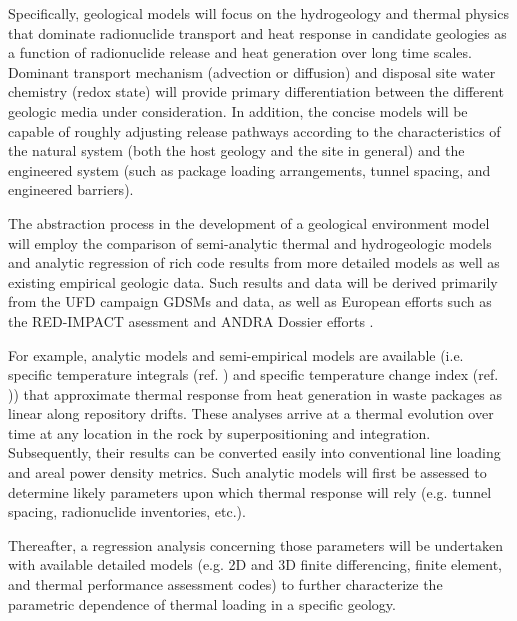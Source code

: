 Specifically, geological models will focus on the hydrogeology and thermal 
physics that dominate radionuclide transport and heat response in candidate 
geologies as a function of radionuclide release and heat generation over long 
time scales. Dominant transport mechanism (advection or 
diffusion) and disposal site water chemistry (redox state) will provide primary 
differentiation between the different geologic media under consideration. In 
addition, the concise models will be capable of roughly adjusting release 
pathways according to the characteristics of the natural system (both the host 
geology and the site in general) and the engineered system (such as package 
loading arrangements, tunnel spacing, and engineered barriers).


The abstraction process in the development of a geological environment model 
will employ the comparison of semi-analytic thermal and hydrogeologic models and 
analytic regression of rich code results from more detailed models as well as 
existing empirical geologic data. Such results and data will be derived 
primarily from the \gls{UFD} campaign \glspl{GDSM} and data, as well as European 
efforts such as the RED-IMPACT asessment and \gls{ANDRA} Dossier efforts 
\cite{von_lensa_red-impact_2008, andra_argile:_2005, clayton_generic_2011} . 


For example, analytic models and semi-empirical models are available (i.e.  
specific temperature integrals (ref. \cite{li_methodology_2006}) and specific 
temperature change index (ref. \cite{radel_effect_2007})) that approximate 
thermal response from heat generation in waste packages as linear along 
repository drifts. These analyses arrive at a thermal evolution over time at any 
location in the rock by superpositioning and integration. Subsequently, their 
results can be converted easily into conventional line loading and areal power 
density metrics.  Such analytic models will first be assessed to determine 
likely parameters upon which thermal response will rely (e.g. tunnel spacing, 
radionuclide inventories, etc.).


Thereafter, a regression analysis concerning those parameters will be undertaken 
with available detailed models (e.g. 2D and 3D finite differencing, finite 
element, and thermal performance assessment codes) to further characterize the 
parametric dependence of thermal loading in a specific geology.  

